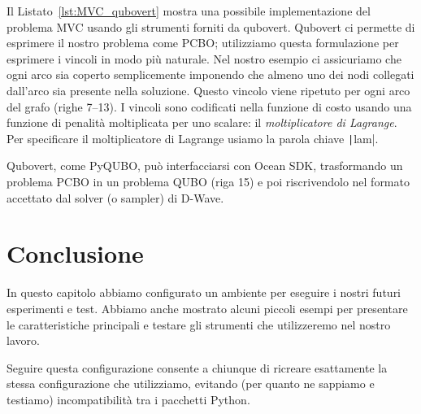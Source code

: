 Il Listato~\ref{lst:MVC_qubovert} mostra una possibile implementazione del problema MVC usando gli strumenti forniti da qubovert. Qubovert ci permette di esprimere il nostro problema come PCBO; utilizziamo questa formulazione per esprimere i vincoli in modo più naturale. Nel nostro esempio ci assicuriamo che ogni arco sia coperto semplicemente imponendo che almeno uno dei nodi collegati dall'arco sia presente nella soluzione. Questo vincolo viene ripetuto per ogni arco del grafo (righe 7–13). I vincoli sono codificati nella funzione di costo usando una funzione di penalità moltiplicata per uno scalare: il \emph{moltiplicatore di Lagrange}. Per specificare il moltiplicatore di Lagrange usiamo la parola chiave \texttt|lam|.

Qubovert, come PyQUBO, può interfacciarsi con Ocean SDK, trasformando un problema PCBO in un problema QUBO (riga 15) e poi riscrivendolo nel formato accettato dal solver (o sampler) di D-Wave.

\section{Conclusione}
In questo capitolo abbiamo configurato un ambiente per eseguire i nostri futuri esperimenti e test. Abbiamo anche mostrato alcuni piccoli esempi per presentare le caratteristiche principali e testare gli strumenti che utilizzeremo nel nostro lavoro.

Seguire questa configurazione consente a chiunque di ricreare esattamente la stessa configurazione che utilizziamo, evitando (per quanto ne sappiamo e testiamo) incompatibilità tra i pacchetti Python.
